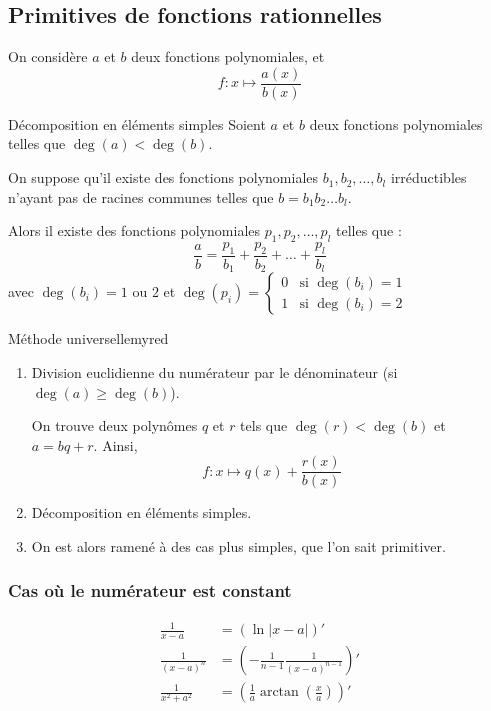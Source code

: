 \subsection{Primitives de fonctions rationnelles}

    On considère $a$ et $b$ deux fonctions polynomiales, et 
    \[ f : x \longmapsto \frac{a(x)}{b(x)} \]

    \begin{theo}{Décomposition en éléments simples}{}
        Soient $a$ et $b$ deux fonctions polynomiales telles que $\deg(a) < \deg(b)$.

        On suppose qu’il existe des fonctions polynomiales $b_1, b_2, \ldots, b_l$ irréductibles n’ayant pas de racines communes telles que $b = b_1 b_2 \ldots b_l$.

        Alors il existe des fonctions polynomiales $p_1, p_2,\ldots,p_l$ telles que :
        \[ \frac{a}{b} = \frac{p_1}{b_1} + \frac{p_2}{b_2} + \ldots + \frac{p_l}{b_l} \]
        avec $\deg(b_i) = 1 \text{ ou } 2$ et $\deg(p_i) = \left\{ \begin{array}{cl}
            0 &\text{si } \deg(b_i) = 1 \\
            1 &\text{si } \deg(b_i) = 2
        \end{array} \right.$
    \end{theo}

    \begin{omed}{Méthode universelle}{myred}
        \begin{enumerate}
            \item Division euclidienne du numérateur par le dénominateur (si $\deg(a) \geq \deg(b)$). 
            
            On trouve deux polynômes $q$ et $r$ tels que $\deg(r) < \deg(b)$ et $a = bq + r$. Ainsi, 
            \[ f : x \mapsto q(x) + \frac{r(x)}{b(x)} \]
            \item Décomposition en éléments simples.
            \item On est alors ramené à des cas plus simples, que l’on sait primitiver.
        \end{enumerate}
    \end{omed}

    \subsubsection{Cas où le numérateur est constant}

    \begin{align}
        \frac{1}{x-a} &= (\ln|x-a|)' \\
        \frac{1}{(x-a)^n} &= \left( - \frac{1}{n-1} \frac{1}{(x-a)^{n-1}}  \right)' \\
        \frac{1}{x^2 + a^2} &= \left( \frac{1}{a} \arctan \left(\frac{x}{a}\right) \right)'
    \end{align}

